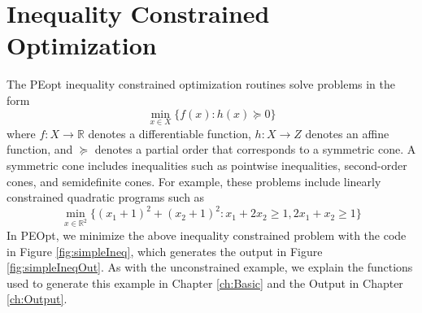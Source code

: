\documentclass{report}
\newcommand{\re}{\mathbb{R}}
\begin{document}
\section{Inequality Constrained Optimization}

        The PEopt inequality constrained optimization routines solve problems in the form
$$
        \min_{x\in X} \{ f(x) : h(x)\succeq 0\}
$$
where $f:X\rightarrow \re$ denotes a differentiable function, $h:X\rightarrow Z$ denotes an affine function, and $\succeq$ denotes a partial order that corresponds to a symmetric cone.  A symmetric cone includes inequalities such as pointwise inequalities, second-order cones, and semidefinite cones.  For example, these problems include linearly constrained quadratic programs such as
$$
        \min_{x\in\re^2}\{(x_1+1)^2+(x_2+1)^2 : x_1 + 2x_2 \geq 1, 2x_1 + x_2\geq 1\}
$$
In PEOpt, we minimize the above inequality constrained problem with the code in Figure \ref{fig:simpleIneq}, which generates the output in Figure \ref{fig:simpleIneqOut}.  As with the unconstrained example, we explain the functions used to generate this example in Chapter \ref{ch:Basic} and the Output in Chapter \ref{ch:Output}.
\end{document}
